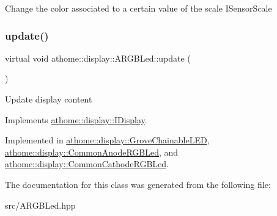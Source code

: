Change the color associated to a certain value of the scale I\+Sensor\+Scale \mbox{\label{classathome_1_1display_1_1_a_r_g_b_led_a725ceca0c01735daa9c95148baf075ab}} 
\subsubsection{\texorpdfstring{update()}{update()}}
{\footnotesize\ttfamily virtual void athome\+::display\+::\+A\+R\+G\+B\+Led\+::update (\begin{DoxyParamCaption}{ }\end{DoxyParamCaption})\hspace{0.3cm}{\ttfamily [pure virtual]}}

Update display content 

Implements \mbox{\hyperlink{classathome_1_1display_1_1_i_display_a4ba7bd5d46f88578f1c846f4f5f3c5d1}{athome\+::display\+::\+I\+Display}}.



Implemented in \mbox{\hyperlink{classathome_1_1display_1_1_grove_chainable_l_e_d_a05a4a1381396b7fc11a24993865d8226}{athome\+::display\+::\+Grove\+Chainable\+L\+ED}}, \mbox{\hyperlink{classathome_1_1display_1_1_common_anode_r_g_b_led_ab7daf7dcc6ac1e3fcab202cae484b237}{athome\+::display\+::\+Common\+Anode\+R\+G\+B\+Led}}, and \mbox{\hyperlink{classathome_1_1display_1_1_common_cathode_r_g_b_led_ab78ab6aef619d8e0941dd11d4cfbb545}{athome\+::display\+::\+Common\+Cathode\+R\+G\+B\+Led}}.



The documentation for this class was generated from the following file\+:\begin{DoxyCompactItemize}
\item 
src/A\+R\+G\+B\+Led.\+hpp\end{DoxyCompactItemize}
